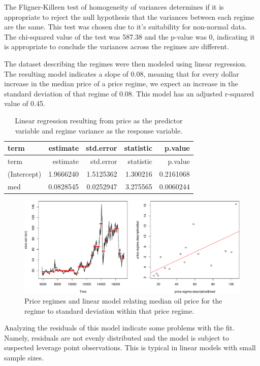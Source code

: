 \documentclass[]{article}
\begin{document}
The Fligner-Killeen test of homogeneity of variances determines if it is
appropriate to reject the null hypothesis that the variances between
each regime are the same. This test was chosen due to it's suitability
for non-normal data. The chi-squared value of the test was 587.38 and
the p-value was 0, indicating it is appropriate to conclude the
variances across the regimes are different.

The dataset describing the regimes were then modeled using linear
regression. The resulting model indicates a slope of 0.08, meaning that
for every dollar increase in the median price of a price regime, we
expect an increase in the standard deviation of that regime of 0.08.
This model has an adjusted r-squared value of 0.45.

\begin{longtable}[]{@{}lrrrr@{}}
\caption{Linear regression resulting from price as the predictor
variable and regime variance as the response variable.}\tabularnewline
\toprule
term & estimate & std.error & statistic & p.value\tabularnewline
\midrule
\endfirsthead
\toprule
term & estimate & std.error & statistic & p.value\tabularnewline
\midrule
\endhead
(Intercept) & 1.9666240 & 1.5125362 & 1.300216 &
0.2161068\tabularnewline
med & 0.0828545 & 0.0252947 & 3.275565 & 0.0060244\tabularnewline
\bottomrule
\end{longtable}

\begin{figure}[htbp]
\centering
\includegraphics{Figs/unnamed-chunk-17-1.pdf}
\caption{Price regimes and linear model relating median oil price for
the regime to standard deviation within that price regime.}
\end{figure}

Analyzing the residuals of this model indicate some problems with the
fit. Namely, residuals are not evenly distributed and the model is
subject to suspected leverage point observations. This is typical in
linear models with small sample sizes.
\end{document}
